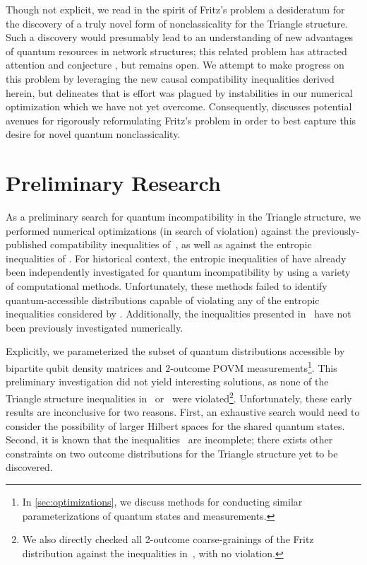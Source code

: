 \documentclass[aps, 10pt, english, twoside, pra, nofootinbib, tightenlines, longbibliography, superscriptaddress]{revtex4-1}
\begin{document}
    Though not explicit, we read in the spirit of Fritz's problem a desideratum for the discovery of a truly novel form of nonclassicality for the Triangle structure. Such a discovery would presumably lead to an understanding of new advantages of quantum resources in network structures; this related problem has attracted attention and conjecture \cite{Gisin_2017}, but remains open. We attempt to make progress on this problem by leveraging the new causal compatibility inequalities derived herein, but  delineates that is effort was plagued by instabilities in our numerical optimization which we have not yet overcome. Consequently,  discusses potential avenues for rigorously reformulating Fritz's problem in order to best capture this desire for novel quantum nonclassicality.

    \section{Preliminary Research}
    \label{sec:preliminary_research}

    As a preliminary search for quantum incompatibility in the Triangle structure, we performed numerical optimizations (in search of violation) against the previously-published compatibility inequalities of~\citet{Inflation}, as well as against the entropic inequalities of \citet{Henson_2014}. For historical context, the entropic inequalities of \cite{Henson_2014} have already been independently investigated for quantum incompatibility by \citet{Weilenmann_2016} using a variety of computational methods. Unfortunately, these methods failed to identify quantum-accessible distributions capable of violating any of the entropic inequalities considered by \cite{Weilenmann_2016}. Additionally, the inequalities presented in~\cite{Inflation} have not been previously investigated numerically.

    Explicitly, we parameterized the subset of quantum distributions accessible by bipartite qubit density matrices and $2$-outcome POVM measurements\footnote{In \cref{sec:optimizations}, we discuss methods for conducting similar parameterizations of quantum states and measurements.}. This preliminary investigation did not yield interesting solutions, as none of the Triangle structure inequalities in~\cite{Inflation} or~\cite{Henson_2014} were violated\footnote{We also directly checked all 2-outcome coarse-grainings of the Fritz distribution against the inequalities in~\cite{Inflation,Henson_2014}, with no violation.}. Unfortunately, these early results are inconclusive for two reasons. First, an exhaustive search would need to consider the possibility of larger Hilbert spaces for the shared quantum states. Second, it is known that the inequalities~\cite{Inflation} are incomplete; there exists other constraints on two outcome distributions for the Triangle structure yet to be discovered.
\end{document}
